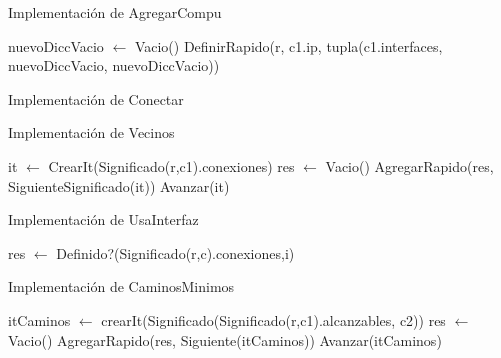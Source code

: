\begin{Algoritmos}
\begin{algorithm}
\caption{Implementaci\'on de AgregarCompu}
\begin{algorithmic}[0]
	\State nuevoDiccVacio $\gets$ Vacio()  
	\State DefinirRapido(r, c1.ip, tupla(c1.interfaces, nuevoDiccVacio, nuevoDiccVacio)) 
\EndFunction {}
\end{algorithmic}
\end{algorithm}

\begin{algorithm}
\caption{Implementaci\'on de Conectar}
\begin{algorithmic}[0]

\EndFunction
\end{algorithmic}
\end{algorithm}

\begin{algorithm}
\caption{Implementaci\'on de Vecinos}
\begin{algorithmic}[0]
	\State it $\gets$ CrearIt(Significado(r,c1).conexiones) 
	\State res $\gets$ Vacio()  
	   
		\State AgregarRapido(res, SiguienteSignificado(it)) 
		\State Avanzar(it) 
	\EndWhile
\EndFunction {}
\end{algorithmic}
\end{algorithm}

\begin{algorithm}
\caption{Implementaci\'on de UsaInterfaz}
\begin{algorithmic}[0]
	\State res $\gets$ Definido?(Significado(r,c).conexiones,i) 
\EndFunction {}
\end{algorithmic}
\end{algorithm}

\begin{algorithm}
\caption{Implementaci\'on de CaminosMinimos}
\begin{algorithmic}[0]
	\State itCaminos $\gets$ crearIt(Significado(Significado(r,c1).alcanzables, c2)) 
	\State res $\gets$ Vacio()  
		\State AgregarRapido(res, Siguiente(itCaminos)) 
		\State Avanzar(itCaminos) 	
	\EndWhile
\EndFunction {}
\end{algorithmic}
\end{algorithm}


\end{Algoritmos}
